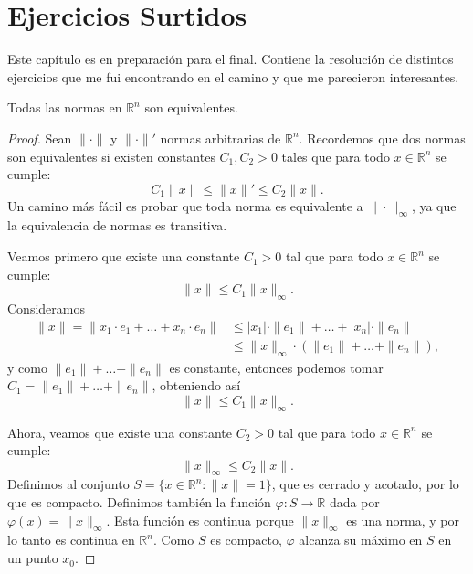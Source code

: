 \chapter{Ejercicios Surtidos}

Este capítulo es en preparación para el final. Contiene la resolución de distintos ejercicios que me fui encontrando en el camino y que me parecieron interesantes.

\begin{exercise}
    Todas las normas en $\mathbb{R}^n$ son equivalentes.
\end{exercise}

\begin{proof}
    Sean $\| \cdot \|$ y $\| \cdot \|'$ normas arbitrarias de $\mathbb{R}^n$. Recordemos que dos normas son equivalentes si existen constantes $C_1, C_2 > 0$ tales que para todo $x \in \mathbb{R}^n$ se cumple:
    \begin{equation*}
        C_1 \| x \| \leq \| x \|' \leq C_2 \| x \|.
    \end{equation*}
    Un camino más fácil es probar que toda norma es equivalente a $\| \cdot \|_{\infty}$, ya que la equivalencia de normas es transitiva.

    Veamos primero que existe una constante $C_1 > 0$ tal que para todo $x \in \mathbb{R}^n$ se cumple:
    \begin{equation*}
        \| x \| \leq C_1 \| x \|_{\infty}.
    \end{equation*}
    Consideramos
    \begin{align*}
        \| x \| = \| x_1 \cdot e_1 + \dots + x_n \cdot e_n \| &\leq |x_1| \cdot \| e_1 \| + \dots + |x_n| \cdot \| e_n \| \\
        &\leq \| x \|_{\infty} \cdot (\| e_1 \| + \dots + \| e_n \|),
    \end{align*}
    y como $\| e_1 \| + \dots + \| e_n \|$ es constante, entonces podemos tomar $C_1 = \| e_1 \| + \dots + \| e_n \|$, obteniendo así 
    \begin{equation*}
        \| x \| \leq C_1 \| x \|_{\infty}.
    \end{equation*}
    
    Ahora, veamos que existe una constante $C_2 > 0$ tal que para todo $x \in \mathbb{R}^n$ se cumple:
    \begin{equation*}
        \| x \|_{\infty} \leq C_2 \| x \|.
    \end{equation*}
    Definimos al conjunto $S = \{ x \in \mathbb{R}^n : \| x \| = 1 \}$, que es cerrado y acotado, por lo que es compacto. Definimos también la función $\varphi : S \to \mathbb{R}$ dada por $\varphi(x) = \| x \|_{\infty}$. Esta función es continua porque $\| x \|_{\infty}$ es una norma, y por lo tanto es continua en $\mathbb{R}^n$. Como $S$ es compacto, $\varphi$ alcanza su máximo en $S$ en un punto $x_0$.


\end{proof}
